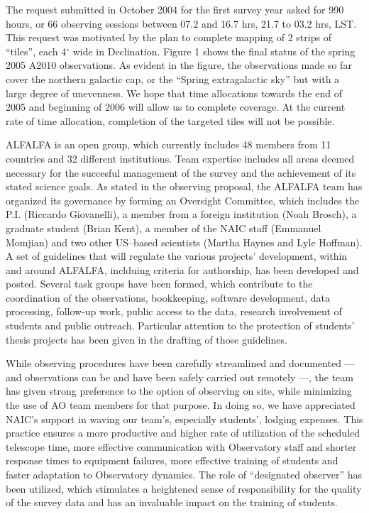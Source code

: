 The request submitted in October 2004
for the first survey year asked for 990 hours, or 66 observing sessions between 
07.2 and 16.7 hrs, 21.7 to 03.2 hrs, LST. This request was motivated by the
plan to complete mapping of 2 strips of ``tiles'', each 4$^\circ$ wide in 
Declination. Figure 1 shows the final status of the spring 2005 A2010 
observations. As evident in the figure, the
observations made so far cover the northern galactic cap, or the
``Spring extragalactic sky'' but with a large degree of unevenness.
We hope that time allocations towards the
end of 2005 and beginning of 2006 will allow us to complete coverage.
At the current rate of time allocation, completion of the targeted tiles
will not be possible. 

ALFALFA is an open group, which currently includes 48 members from 11 countries
and 32 different institutions. Team expertise includes all areas deemed 
necessary for the succesful management of the survey and the achievement of
its stated science goals. 
As stated in the observing proposal, the ALFALFA team has organized its governance
by forming an Oversight Committee, which includes the P.I. (Riccardo Giovanelli),
a member from a foreign institution (Noah Brosch), a graduate student (Brian Kent), 
a member of the NAIC staff (Emmanuel Momjian) and two other US--based scientists 
(Martha Haynes and
Lyle Hoffman). A set of guidelines that will regulate the various projects'
development, within and around ALFALFA, inclduing criteria for authorship, 
has been developed and posted. Several
task groups have been formed, which contribute to the coordination of the
observations, bookkeeping, software development, data processing, follow-up
work, public access to the data, research involvement of students and public 
outreach. Particular attention to the protection of students' thesis projects
has been given in the drafting of those guidelines.

While observing procedures have been carefully streamlined and documented ---
and observations can be and have been safely carried out remotely ---, the 
team has given strong
preference to the option of observing on site, while minimizing the use
of AO team members for that purpose. In doing so, we have appreciated NAIC's
support in waving our team's, especially students', lodging expenses. This 
practice ensures a more productive and higher
rate of utilization of the scheduled telescope time, more effective communication
with Observatory staff and shorter response times to equipment failures, more
effective training of students and faster adaptation to Observatory dynamics.
The role of ``designated observer'' has been utilized, which stimulates a
heightened sense of responsibility for the quality of the survey data and
has an invaluable impact on the training of students.

